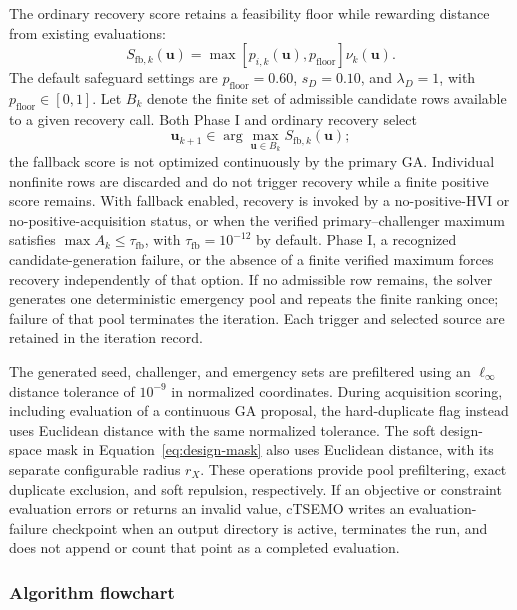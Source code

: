 \documentclass[twoside]{article}
\begin{document}
The ordinary recovery score retains a feasibility floor while rewarding
distance from existing evaluations:
\begin{equation}
  S_{\mathrm{fb},k}(\mathbf{u})
  =
  \max\!\left[p_{i,k}(\mathbf{u}),p_{\mathrm{floor}}\right]
  \nu_k(\mathbf{u}).
  \label{eq:fallback-score}
\end{equation}
The default safeguard settings are \(p_{\mathrm{floor}}=0.60\),
\(s_D=0.10\), and \(\lambda_D=1\), with
\(p_{\mathrm{floor}}\in[0,1]\).
Let \(B_k\) denote the finite set of admissible candidate rows available to a
given recovery call. Both Phase I and ordinary recovery select
\[
  \mathbf{u}_{k+1}\in
  \arg\max_{\mathbf{u}\in B_k}S_{\mathrm{fb},k}(\mathbf{u});
\]
the fallback score is not optimized continuously by the primary GA.
Individual nonfinite rows are discarded and do not trigger recovery while a
finite positive score remains. With fallback enabled, recovery is invoked by
a no-positive-HVI or no-positive-acquisition status, or when the verified
primary--challenger maximum satisfies
\(\max A_k\leq\tau_{\mathrm{fb}}\), with
\(\tau_{\mathrm{fb}}=10^{-12}\) by default. Phase I, a recognized
candidate-generation failure, or the absence of a finite verified maximum
forces recovery independently of that option. If no admissible row remains,
the solver generates one deterministic emergency pool and repeats the finite
ranking once; failure of that pool terminates the iteration. Each trigger and
selected source are retained in the iteration record.

The generated seed, challenger, and emergency sets are prefiltered using an
\(\ell_\infty\) distance tolerance of \(10^{-9}\) in normalized coordinates.
During acquisition scoring, including evaluation of a continuous GA proposal,
the hard-duplicate flag instead uses Euclidean distance with the same
normalized tolerance. The soft design-space mask in
Equation~\eqref{eq:design-mask} also uses Euclidean distance, with its
separate configurable radius \(r_X\). These operations provide pool
prefiltering, exact duplicate exclusion, and soft repulsion, respectively. If an objective or constraint
evaluation errors or returns an invalid value, cTSEMO writes an
evaluation-failure checkpoint when an output directory is active, terminates
the run, and does not append or count that point as a completed evaluation.

\subsubsection{Algorithm flowchart}
\end{document}

